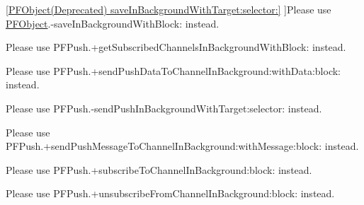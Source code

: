 \begin{DoxyRefList}
\hyperlink{category_p_f_object_07_deprecated_08_a26f570270d7ef495ba0de01fd6518fe9}{\mbox{[}P\+F\+Object(Deprecated) save\+In\+Background\+With\+Target\+:selector\+:\mbox{]}} ]Please use {\ttfamily \hyperlink{interface_p_f_object}{P\+F\+Object}.-\/save\+In\+Background\+With\+Block\+:} instead.  
\item[\label{deprecated__deprecated000031}%
\hypertarget{deprecated__deprecated000031}{}%
\hyperlink{category_p_f_push_07_deprecated_08_abd7166ef5c38590d9ab6a29e98b9ace7}{\mbox{[}P\+F\+Push(Deprecated) get\+Subscribed\+Channels\+In\+Background\+With\+Target\+:selector\+:\mbox{]}} ]Please use {\ttfamily P\+F\+Push.+get\+Subscribed\+Channels\+In\+Background\+With\+Block\+:} instead.  
\item[\label{deprecated__deprecated000030}%
\hypertarget{deprecated__deprecated000030}{}%
\hyperlink{category_p_f_push_07_deprecated_08_a070298e87ef7343de2ec870446200d0b}{\mbox{[}P\+F\+Push(Deprecated) send\+Push\+Data\+To\+Channel\+In\+Background\+:with\+Data\+:target\+:selector\+:\mbox{]}} ]Please use {\ttfamily P\+F\+Push.+send\+Push\+Data\+To\+Channel\+In\+Background\+:with\+Data\+:block\+:} instead.  
\item[\label{deprecated__deprecated000029}%
\hypertarget{deprecated__deprecated000029}{}%
\hyperlink{category_p_f_push_07_deprecated_08_a065a1a249c7b222175a396dd791d7949}{\mbox{[}P\+F\+Push(Deprecated) send\+Push\+In\+Background\+With\+Target\+:selector\+:\mbox{]}} ]Please use {\ttfamily P\+F\+Push.-\/send\+Push\+In\+Background\+With\+Target\+:selector\+:} instead.  
\item[\label{deprecated__deprecated000028}%
\hypertarget{deprecated__deprecated000028}{}%
\hyperlink{category_p_f_push_07_deprecated_08_a2d43569d4b36fd0a5de8c660516cc965}{\mbox{[}P\+F\+Push(Deprecated) send\+Push\+Message\+To\+Channel\+In\+Background\+:with\+Message\+:target\+:selector\+:\mbox{]}} ]Please use {\ttfamily P\+F\+Push.+send\+Push\+Message\+To\+Channel\+In\+Background\+:with\+Message\+:block\+:} instead.  
\item[\label{deprecated__deprecated000032}%
\hypertarget{deprecated__deprecated000032}{}%
\hyperlink{category_p_f_push_07_deprecated_08_a8cbea9ad99b6403e9f91bab7d68bead3}{\mbox{[}P\+F\+Push(Deprecated) subscribe\+To\+Channel\+In\+Background\+:target\+:selector\+:\mbox{]}} ]Please use {\ttfamily P\+F\+Push.+subscribe\+To\+Channel\+In\+Background\+:block\+:} instead.  
\item[\label{deprecated__deprecated000033}%
\hypertarget{deprecated__deprecated000033}{}%
\hyperlink{category_p_f_push_07_deprecated_08_a929d5a6cf42c21a8ff3abc3fb3659647}{\mbox{[}P\+F\+Push(Deprecated) unsubscribe\+From\+Channel\+In\+Background\+:target\+:selector\+:\mbox{]}} ]Please use {\ttfamily P\+F\+Push.+unsubscribe\+From\+Channel\+In\+Background\+:block\+:} instead.  

\end{DoxyRefList}
